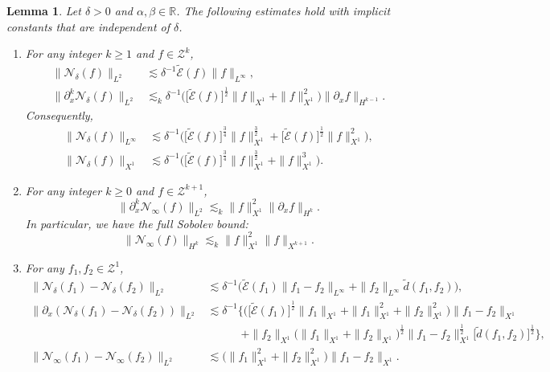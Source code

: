 \documentclass[10pt,a4paper]{amsart}
\newtheorem{lemma}{Lemma}
\begin{document}
\begin{lemma}\label{lem:N0N1}
Let $\delta>0$ and $\alpha, \beta \in \mathbb{R}$. The following estimates hold with implicit constants that are independent of $\delta$.
\begin{enumerate}
\item[$\mathrm{(i)}$] For any integer $k\geq 1$ and $f\in \mathcal{Z}^k$,
\begin{align*}
\| \mathcal{N}_\delta(f)\|_{L^2}&\lesssim \delta^{-1}\widetilde{\mathcal{E}}(f)\| f\|_{L^\infty}, \\
\| \partial_x^k\mathcal{N}_\delta(f)\|_{L^2}&\lesssim_k \delta^{-1}\Big( \big[ \widetilde{\mathcal{E}}(f)\big]^{\frac12}\| f\|_{X^1}+\| f\|_{X^1}^2\Big) \| \partial_xf\|_{H^{k-1}}.
\end{align*}
Consequently, 
\begin{align*}
\| \mathcal{N}_\delta(f)\|_{L^\infty}&\lesssim \delta^{-1}\Big( \big[ \widetilde{\mathcal{E}}(f)\big] ^{\frac34} \| f\|_{X^1}^{\frac32}+\big[ \widetilde{\mathcal{E}}(f)\big] ^{\frac12}\| f\|_{X^1}^2\Big), \\
\| \mathcal{N}_\delta(f)\|_{X^1}&\lesssim \delta^{-1}\Big( \big[ \widetilde{\mathcal{E}}(f)\big] ^{\frac34} \| f\|_{X^1}^{\frac32}+\| f\|_{X^1}^3\Big).
\end{align*}
\item[$\mathrm{(ii)}$] For any integer $k\geq 0$ and $f\in \mathcal{Z}^{k+1}$, 
\[ \| \partial_x^k\mathcal{N}_\infty(f)\|_{L^2}\lesssim_k \| f\|_{X^1}^2\| \partial_xf\|_{H^k}.\]
In particular, we have the full Sobolev bound:
\[ \| \mathcal{N}_\infty(f)\|_{H^k}\lesssim_k \| f\|_{X^1}^2\| f\|_{X^{k+1}}.\]
\item[$\mathrm{(iii)}$] For any $f_1,f_2\in \mathcal{Z}^1$, 
\begin{align*}
\| \mathcal{N}_\delta(f_1)-\mathcal{N}_\delta(f_2)\|_{L^2}&\lesssim \delta^{-1}\Big( \widetilde{\mathcal{E}}(f_1)\| f_1-f_2\|_{L^\infty} +\| f_2\|_{L^\infty} \widetilde{d}(f_1,f_2)\Big) , \\
\| \partial_x(\mathcal{N}_\delta(f_1)-\mathcal{N}_\delta(f_2))\|_{L^2}&\lesssim \delta^{-1}\Big\{ \Big( \big[ \widetilde{\mathcal{E}}(f_1)\big] ^{\frac12} \| f_1\|_{X^1}+\| f_1\|_{X^1}^2+\| f_2\|_{X^1}^2\Big)\| f_1-f_2\|_{X^1}\\
&\quad\qquad +\| f_2\|_{X^1}\big( \| f_1\|_{X^1}+\| f_2\|_{X^1}\big)^{\frac12}\| f_1-f_2\|_{X^1}^{\frac12}\big[ \widetilde{d}(f_1,f_2)\big] ^{\frac12} \Big\} ,\\
\| \mathcal{N}_\infty(f_1)-\mathcal{N}_\infty(f_2)\|_{L^2}&\lesssim
\big( \| f_1\|_{X^1}^2+\| f_2\|_{X^1}^2\big) \| f_1-f_2\|_{X^1}.
\end{align*}
\end{enumerate}
\end{lemma}
\end{document}
